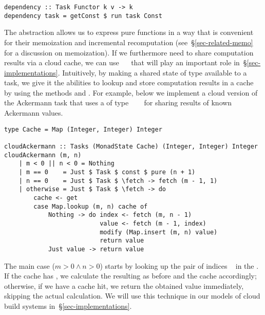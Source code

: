 \vspace{1mm}
\begin{verbatim}
dependency :: Task Functor k v -> k
dependency task = getConst $ run task Const
\end{verbatim}
\vspace{1mm}

\noindent
The  abstraction allows us to express pure functions in a way that
is convenient for their memoization and incremental recomputation
(see~\S\ref{sec-related-memo} for a discussion on memoization). If we
furthermore need to share computation results via a cloud cache, we can use
~~ that will
play an important role in~\S\ref{sec-implementations}. Intuitively, by making
a shared state of type  available to a task, we give it the abilities to
lookup and store computation results in a cache by using the 
methods  and . For example, below we implement a cloud version
of the Ackermann task that uses a  of type
~~~ for sharing results of known
Ackermann values.

\vspace{1mm}
\begin{verbatim}
type Cache = Map (Integer, Integer) Integer

cloudAckermann :: Tasks (MonadState Cache) (Integer, Integer) Integer
cloudAckermann (m, n)
    | m < 0 || n < 0 = Nothing
    | m == 0    = Just $ Task $ const $ pure (n + 1)
    | n == 0    = Just $ Task $ \fetch -> fetch (m - 1, 1)
    | otherwise = Just $ Task $ \fetch -> do
        cache <- get
        case Map.lookup (m, n) cache of
            Nothing -> do index <- fetch (m, n - 1)
                          value <- fetch (m - 1, index)
                          modify (Map.insert (m, n) value)
                          return value
            Just value -> return value
\end{verbatim}
\vspace{1mm}

\noindent
The main case ($m>0 \wedge n>0$) starts by looking up the pair of indices
\hs{(}~ in the . If the cache has , we
calculate the resulting  as before and  the cache
accordingly; otherwise, if we have a cache hit, we return the obtained value
immediately, skipping the actual calculation. We will use this technique in our
models of cloud build systems in~\S\ref{sec-implementations}.
